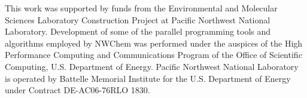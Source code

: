 
This work was supported by funds from the Environmental and Molecular
Sciences Laboratory Construction Project at Pacific Northwest National
Laboratory.  Development of some of the parallel programming tools and
algorithms employed by NWChem was performed under the auspices of the
High Performance Computing and Communications Program of the Office of
Scientific Computing, U.S.  Department of Energy.  Pacific Northwest
National Laboratory is operated by Battelle Memorial Institute for the U.S.
Department of Energy under Contract DE-AC06-76RLO 1830.

